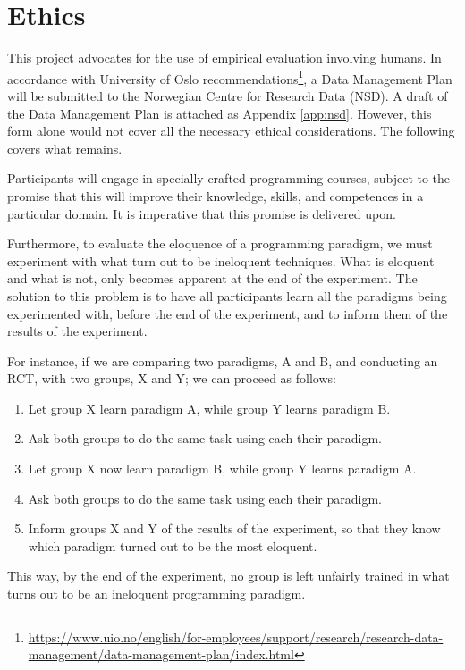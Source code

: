 \section{Ethics}

This project advocates for the use of empirical evaluation involving
humans. In accordance with University of Oslo
recommendations\footnote{\url{https://www.uio.no/english/for-employees/support/research/research-data-management/data-management-plan/index.html}},
a Data Management Plan will be submitted to the Norwegian Centre for
Research Data (NSD). A draft of the Data Management Plan is attached
as Appendix \ref{app:nsd}. However, this form alone would not cover
all the necessary ethical considerations. The following covers what
remains.

Participants will engage in specially crafted programming courses,
subject to the promise that this will improve their knowledge, skills,
and competences in a particular domain. It is imperative that this
promise is delivered upon.

Furthermore, to evaluate the eloquence of a programming paradigm, we
must experiment with what turn out to be ineloquent techniques. What
is eloquent and what is not, only becomes apparent at the end of the
experiment. The solution to this problem is to have all participants
learn all the paradigms being experimented with, before the end of the
experiment, and to inform them of the results of the experiment.

For instance, if we are comparing two paradigms, A and B, and
conducting an RCT, with two groups, X and Y; we can proceed as
follows:

\begin{enumerate}

\item Let group X learn paradigm A, while group Y learns paradigm B.

\item Ask both groups to do the same task using each their paradigm.

\item Let group X now learn paradigm B, while group Y learns paradigm A.

\item Ask both groups to do the same task using each their paradigm.

\item Inform groups X and Y of the results of the experiment, so that
they know which paradigm turned out to be the most eloquent.

\end{enumerate}

This way, by the end of the experiment, no group is left unfairly
trained in what turns out to be an ineloquent programming paradigm.
